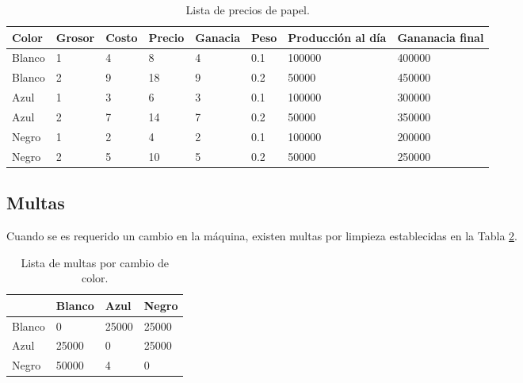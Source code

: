 \begin{table}[htbp]
\centering
\caption{Lista de precios de papel.}
\begin{tabular}{llllllll}
\hline
Color  & Grosor & Costo & Precio & Ganacia & Peso & Producción al día & Gananacia final \\ \hline
Blanco & 1      & 4     & 8      & 4       & 0.1  & 100000            & 400000          \\
Blanco & 2      & 9     & 18     & 9       & 0.2  & 50000             & 450000          \\
Azul   & 1      & 3     & 6      & 3       & 0.1  & 100000            & 300000          \\
Azul   & 2      & 7     & 14     & 7       & 0.2  & 50000             & 350000          \\
Negro  & 1      & 2     & 4      & 2       & 0.1  & 100000            & 200000          \\
Negro  & 2      & 5     & 10     & 5       & 0.2  & 50000             & 250000          \\ \hline
\end{tabular}
\label{tab: precios}
\end{table}

\subsection{Multas}
Cuando se es requerido un cambio en la máquina, existen multas por limpieza establecidas en la Tabla \ref{tab: multas}.

\begin{table}[htbp]
\centering
\caption{Lista de multas por cambio de color.}
\begin{tabular}{llll}
\hline
       & Blanco & Azul  & Negro \\ \hline
Blanco & 0      & 25000 & 25000 \\
Azul   & 25000  & 0     & 25000 \\
Negro  & 50000  & 4     & 0    
\end{tabular}
\label{tab: multas}
\end{table}